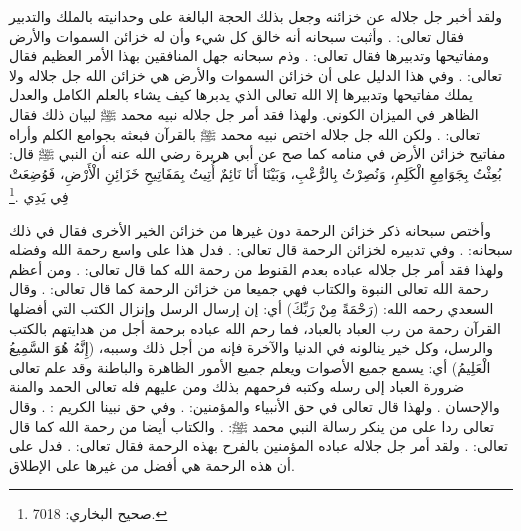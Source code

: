 ولقد أخبر جل جلاله عن خزائنه وجعل بذلك الحجة البالغة على وحدانيته بالملك والتدبير فقال تعالى: 
\quranayah*[52][37]{\footnotesize \surahname*[52]}. وأثبت سبحانه أنه خالق كل شيء وأن له خزائن السموات والأرض ومفاتيحها وتدبيرها فقال تعالى: 
\quranayah*[39][62-63]{\footnotesize \surahname*[39]}. وذم سبحانه جهل المنافقين بهذا الأمر العظيم فقال تعالى: \quranayah*[63][7][13]{\footnotesize \surahname*[63]}. وفي هذا الدليل على أن خزائن السموات والأرض هي خزائن الله جل جلاله ولا يملك مفاتيحها وتدبيرها إلا الله تعالى الذي يدبرها كيف يشاء بالعلم الكامل والعدل الظاهر في الميزان الكوني. ولهذا فقد أمر جل جلاله نبيه محمد ﷺ لبيان ذلك فقال تعالى: \quranayah*[6][50]{\footnotesize \surahname*[6]}. ولكن الله جل جلاله اختص نبيه محمد ﷺ بالقرآن فبعثه بجوامع الكلم وأراه مفاتيح خزائن الأرض في منامه كما صح عن أبي هريرة رضي الله عنه أن النبي ﷺ قال: بُعِثْتُ بِجَوَامِعِ الْكَلِمِ، وَنُصِرْتُ بِالرُّعْبِ، وَبَيْنَا أَنَا نَائِمٌ أُتِيتُ بِمَفَاتِيحِ خَزَائِنِ الْأَرْضِ، فَوُضِعَتْ فِي يَدِي \href{https://shamela.ws/book/1284/4398#p2}{\faExternalLink} \cite{bukhari}.\footnote{صحيح البخاري: 7018.} 

وأختص سبحانه ذكر خزائن الرحمة دون غيرها من خزائن الخير الأخرى فقال في ذلك سبحانه: 
\quranayah*[38][9]{\footnotesize \surahname*[38]}. وفي تدبيره لخزائن الرحمة قال تعالى: 
\quranayah*[17][100]{\footnotesize \surahname*[17]}. فدل هذا على واسع رحمة الله وفضله ولهذا فقد أمر جل جلاله عباده بعدم القنوط من رحمة الله كما قال تعالى: 
\quranayah*[39][53]{\footnotesize \surahname*[39]}. 
ومن أعظم رحمة الله تعالى النبوة والكتاب فهي جميعا من خزائن الرحمة كما قال تعالى: 
\quranayah*[44][6]{\footnotesize \surahname*[44]}. وقال السعدي رحمه الله: (رَحْمَةً مِنْ رَبِّكَ) أي: إن إرسال الرسل وإنزال الكتب التي أفضلها القرآن رحمة من رب العباد بالعباد، فما رحم الله عباده برحمة أجل من هدايتهم بالكتب والرسل، وكل خير ينالونه في الدنيا والآخرة فإنه من أجل ذلك وسببه، (إِنَّهُ هُوَ السَّمِيعُ الْعَلِيمُ) أي: يسمع جميع الأصوات ويعلم جميع الأمور الظاهرة والباطنة وقد علم تعالى ضرورة العباد إلى رسله وكتبه فرحمهم بذلك ومن عليهم فله تعالى الحمد والمنة والإحسان \href{https://shamela.ws/book/42/1753#p4}{\faExternalLink} \cite{tafsir_Saadi}.
ولهذا قال تعالى في حق الأنبياء والمؤمنين: 
\quranayah*[3][74]{\footnotesize \surahname*[3]}.
وفي حق نبينا الكريم : 
\quranayah*[21][107]{\footnotesize \surahname*[21]}.  وقال تعالى ردا على من ينكر رسالة النبي محمد ﷺ: \quranayah*[43][32]{\footnotesize \surahname*[43]}. والكتاب أيضا من رحمة الله كما قال تعالى: 
\quranayah*[31][2-3]{\footnotesize \surahname*[31]}. ولقد أمر جل جلاله عباده المؤمنين بالفرح بهذه الرحمة فقال تعالى: 
\quranayah*[10][57-58]{\footnotesize \surahname*[10]}. فدل على أن هذه الرحمة هي أفضل من غيرها على الإطلاق.

